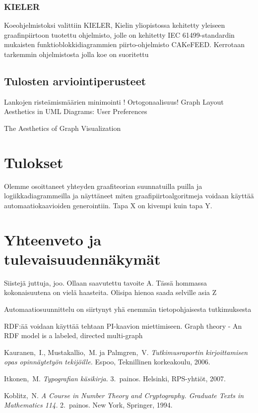 \documentclass[finnish,12pt]{article}
\begin{document}
			\subsubsection{KIELER}

Koeohjelmistoksi valittiin KIELER, Kielin yliopistossa kehitetty yleiseen graafinpiirtoon tuotettu ohjelmisto, jolle on kehitetty IEC 61499-standardin mukaisten funktioblokkidiagrammien piirto-ohjelmisto CAKeFEED. 
Kerrotaan tarkemmin ohjelmistosta jolla koe on suoritettu

		\subsection{Tulosten arviointiperusteet}

Lankojen risteämismäärien minimointi !
Ortogonaalisuus!
Graph Layout Aesthetics in UML Diagrams: User Preferences

The Aesthetics of Graph Visualization

	\clearpage
	\section{Tulokset}
	
Olemme osoittaneet yhteyden graafiteorian suunnatuilla puilla ja logiikkadiagrammeilla ja näyttäneet miten graafipiirtoalgoritmeja voidaan käyttää automaatiokaavioiden generointiin.
Tapa X on kivempi kuin tapa Y.

	\section{Yhteenveto ja tulevaisuudennäkymät}
	
Siistejä juttuja, joo. Ollaan saavutettu tavoite A. Tässä hommassa kokonaisuutena on vielä haasteita. Olisipa hienoa saada selville asia Z

Automaatiosuunnittelu on siirtynyt yhä enemmän tietopohjaisesta tutkimuksesta

RDF:ää voidaan käyttää tehtaan PI-kaavion miettimiseen.
Graph theory - An RDF model is a labeled, directed multi-graph


\clearpage
{}

\begin{thebibliography}{99}
	 Kauranen,\ I., Mustakallio,\ M. ja Palmgren,\ V.
	  \textit{Tutkimusraportin kirjoittamisen opas opinnäytetyön
		tekijöille.}  Espoo, Teknillinen korkeakoulu, 2006.

	 Itkonen,\ M. \textit{Typografian käsikirja.} 3.\
	  painos.  Helsinki, RPS-yhtiöt, 2007.

	 Koblitz,\ N. \textit{A Course in Number Theory and
		Cryptography. Graduate Texts in Mathematics 114.}  2.\ painos. New
	  York, Springer, 1994.

	\end{thebibliography}
\end{document}
